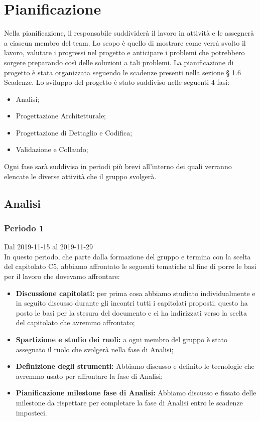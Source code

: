 \section{Pianificazione}
Nella pianificazione, il responsabile suddividerà il lavoro in attività e le assegnerà a ciascun membro del team.
Lo scopo è quello di mostrare come verrà svolto il lavoro, valutare i progressi nel progetto e anticipare i problemi che potrebbero sorgere preparando così delle soluzioni a tali problemi. 
La pianificazione di progetto è stata organizzata seguendo le scadenze presenti nella sezione § 1.6 Scadenze.
Lo sviluppo del progetto è stato suddiviso nelle seguenti 4 fasi: 
\begin{itemize}
	\item Analisi;
	\item Progettazione Architetturale;
	\item Progettazione di Dettaglio e Codifica;
	\item Validazione e Collaudo;
\end{itemize}
Ogni fase sarà suddivisa in periodi più brevi all'interno dei quali verranno elencate le diverse attività che il gruppo \Gruppo{} svolgerà.


\subsection{Analisi}

\subsubsection{Periodo 1} 
Dal 2019-11-15 al 2019-11-29\\
In questo periodo, che parte dalla formazione del gruppo e termina con la scelta del capitolato C5, abbiamo affrontato le seguenti tematiche al fine di porre le basi per il lavoro che dovevamo affrontare:\\
\begin{itemize}
	\item \textbf{Discussione capitolati:} per prima cosa abbiamo studiato individualmente e in seguito discusso durante gli incontri tutti i capitolati proposti, questo ha posto le basi per la stesura del documento \SdF{} e ci ha indirizzati verso la scelta del capitolato che avremmo affrontato;
	\item \textbf{Spartizione e studio dei ruoli:} a ogni membro del gruppo è stato assegnato il ruolo che svolgerà nella fase di Analisi;
	\item \textbf{Definizione degli strumenti:} Abbiamo discusso e definito le tecnologie che avremmo usato per affrontare la fase di Analisi;
	\item \textbf{Pianificazione milestone fase di Analisi:} Abbiamo discusso e fissato delle milestone da rispettare per completare la fase di Analisi entro le scadenze imposteci.
\end{itemize}
